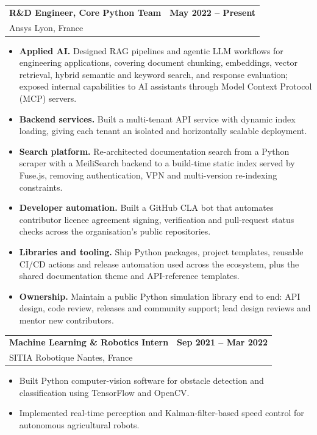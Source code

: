 \documentclass[10.5pt, a4paper]{article}
\makeatletter
\newcommand{\entry}[3]{%
    \begin{tabularx}{\textwidth}{@{}Xr@{}}
        \textbf{#1} & \small\bfseries\color{accent}#3 \\[-0.3ex]
        \small\color{subtle}#2 &                      \\
    \end{tabularx}}
\newcommand{\sep}{\;\textcolor{hairline}{\textbullet}\;}
\makeatother
\begin{document}
\entry{R\&D Engineer, Core Python Team}{Ansys \sep Lyon, France}{May 2022 -- Present}
\begin{itemize}
    \item \textbf{Applied AI.} Designed RAG pipelines and agentic LLM workflows for engineering applications, covering document chunking, embeddings, vector retrieval, hybrid semantic and keyword search, and response evaluation; exposed internal capabilities to AI assistants through Model Context Protocol (MCP) servers.
    \item \textbf{Backend services.} Built a multi-tenant API service with dynamic index loading, giving each tenant an isolated and horizontally scalable deployment.
    \item \textbf{Search platform.} Re-architected documentation search from a Python scraper with a MeiliSearch backend to a build-time static index served by Fuse.js, removing authentication, VPN and multi-version re-indexing constraints.
    \item \textbf{Developer automation.} Built a GitHub CLA bot that automates contributor licence agreement signing, verification and pull-request status checks across the organisation's public repositories.
    \item \textbf{Libraries and tooling.} Ship Python packages, project templates, reusable CI/CD actions and release automation used across the ecosystem, plus the shared documentation theme and API-reference templates.
    \item \textbf{Ownership.} Maintain a public Python simulation library end to end: API design, code review, releases and community support; lead design reviews and mentor new contributors.
\end{itemize}

\vspace{1.0ex}
\entry{Machine Learning \& Robotics Intern}{SITIA Robotique \sep Nantes, France}{Sep 2021 -- Mar 2022}
\begin{itemize}
    \item Built Python computer-vision software for obstacle detection and classification using TensorFlow and OpenCV.
    \item Implemented real-time perception and Kalman-filter-based speed control for autonomous agricultural robots.
\end{itemize}

\end{document}
